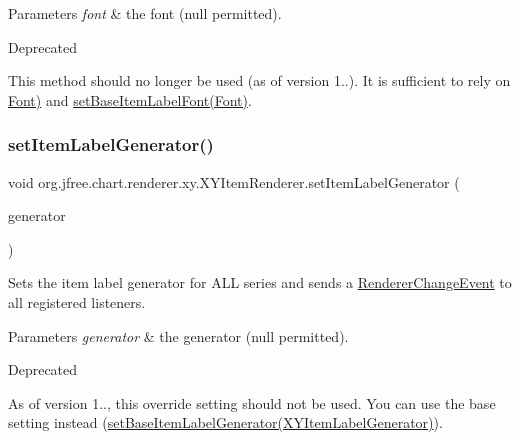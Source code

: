 \begin{DoxyParams}{Parameters}
{\em font} & the font ({\ttfamily null} permitted).\\
\hline
\end{DoxyParams}
\begin{DoxyRefDesc}{Deprecated}
\item[\mbox{\hyperlink{deprecated__deprecated000230}{Deprecated}}]This method should no longer be used (as of version 1..). It is sufficient to rely on \mbox{\hyperlink{}{Font)}} and \mbox{\hyperlink{interfaceorg_1_1jfree_1_1chart_1_1renderer_1_1xy_1_1_x_y_item_renderer_a5ab327bbbdbfa822d87e23e2a0619c62}{set\+Base\+Item\+Label\+Font(\+Font)}}. \end{DoxyRefDesc}
\mbox{\label{interfaceorg_1_1jfree_1_1chart_1_1renderer_1_1xy_1_1_x_y_item_renderer_ac0a393bdb421d5fae14a1c5b0a0dc95b}} 
\subsubsection{\texorpdfstring{set\+Item\+Label\+Generator()}{setItemLabelGenerator()}}
{\footnotesize\ttfamily void org.\+jfree.\+chart.\+renderer.\+xy.\+X\+Y\+Item\+Renderer.\+set\+Item\+Label\+Generator (\begin{DoxyParamCaption}\item[{\mbox{\hyperlink{interfaceorg_1_1jfree_1_1chart_1_1labels_1_1_x_y_item_label_generator}{X\+Y\+Item\+Label\+Generator}}}]{generator }\end{DoxyParamCaption})}

Sets the item label generator for A\+LL series and sends a \mbox{\hyperlink{}{Renderer\+Change\+Event}} to all registered listeners.


\begin{DoxyParams}{Parameters}
{\em generator} & the generator ({\ttfamily null} permitted).\\
\hline
\end{DoxyParams}
\begin{DoxyRefDesc}{Deprecated}
\item[\mbox{\hyperlink{deprecated__deprecated000227}{Deprecated}}]As of version 1.., this override setting should not be used. You can use the base setting instead (\mbox{\hyperlink{interfaceorg_1_1jfree_1_1chart_1_1renderer_1_1xy_1_1_x_y_item_renderer_adb2a89010f4e58e1b4efc1a0e4c1df22}{set\+Base\+Item\+Label\+Generator(\+X\+Y\+Item\+Label\+Generator)}}). \end{DoxyRefDesc}


